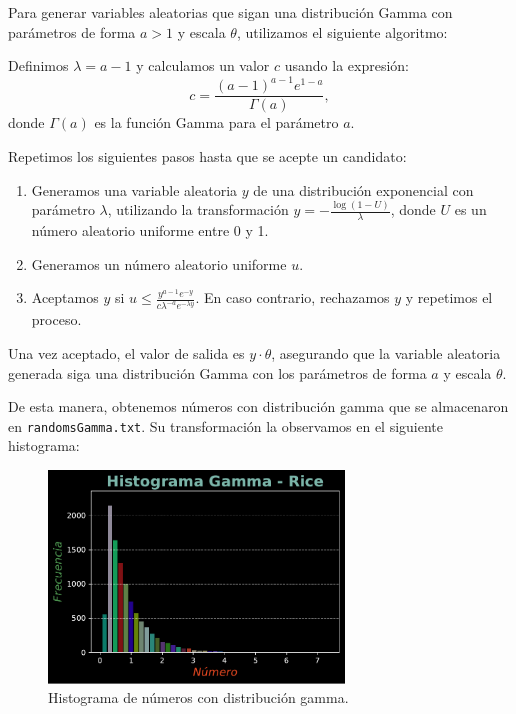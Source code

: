 \documentclass[11pt]{article} %
\begin{document}
	 Para generar variables aleatorias que sigan una distribución Gamma con parámetros de forma $a > 1$ y escala $\theta$, utilizamos el siguiente algoritmo:
	 
	 Definimos $\lambda = a - 1$ y calculamos un valor $c$ usando la expresión:
	 \[
	 c = \frac{(a - 1)^{a - 1} e^{1-a}}{\Gamma(a)},
	 \]
	 donde $\Gamma(a)$ es la función Gamma para el parámetro $a$.
	 
	 Repetimos los siguientes pasos hasta que se acepte un candidato:
	 \begin{enumerate}
	 	\item Generamos una variable aleatoria $y$ de una distribución exponencial con parámetro $\lambda$, utilizando la transformación $y = -\frac{\log(1-U)}{\lambda}$, donde $U$ es un número aleatorio uniforme entre 0 y 1.
	 	\item Generamos un número aleatorio uniforme $u$.
	 	\item Aceptamos $y$ si $u \leq \frac{y^{a-1} e^{-y}}{c \lambda^{-a} e^{-\lambda y}}$. En caso contrario, rechazamos $y$ y repetimos el proceso.
	 \end{enumerate}
	 
	 Una vez aceptado, el valor de salida es $y \cdot \theta$, asegurando que la variable aleatoria generada siga una distribución Gamma con los parámetros de forma $a$ y escala $\theta$.
	 
	 De esta manera, obtenemos números con distribución gamma que se almacenaron en \texttt{randomsGamma.txt}. Su transformación la observamos en el siguiente histograma:
	 
	 \begin{figure}[h]
	 	\centering
	 	\includegraphics[width=0.70\textwidth]{../transformaciones/hist_gamma_Rice.pdf}
	 	\caption{Histograma de números con distribución gamma.}
	 	\label{fig:randomsGamma}
	 \end{figure}
	 \newpage
	 
\end{document}

